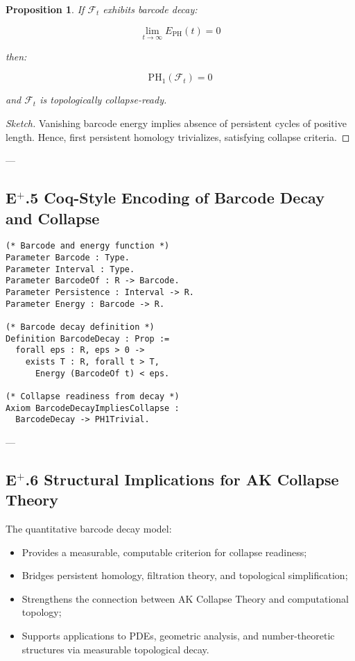 \documentclass[11pt]{article}
\newtheorem{proposition}[theorem]{Proposition}
\begin{document}
\begin{proposition}
If $\mathcal{F}_t$ exhibits barcode decay:

\[
\lim_{t \to \infty} E_{\mathrm{PH}}(t) = 0
\]

then:

\[
\mathrm{PH}_1(\mathcal{F}_t) = 0
\]

and $\mathcal{F}_t$ is topologically collapse-ready.
\end{proposition}

\begin{proof}[Sketch]
Vanishing barcode energy implies absence of persistent cycles of positive length. Hence, first persistent homology trivializes, satisfying collapse criteria.
\end{proof}

---

\subsection*{E$^{+}$.5 Coq-Style Encoding of Barcode Decay and Collapse}

\begin{lstlisting}[language=Coq]
(* Barcode and energy function *)
Parameter Barcode : Type.
Parameter Interval : Type.
Parameter BarcodeOf : R -> Barcode.
Parameter Persistence : Interval -> R.
Parameter Energy : Barcode -> R.

(* Barcode decay definition *)
Definition BarcodeDecay : Prop :=
  forall eps : R, eps > 0 ->
    exists T : R, forall t > T,
      Energy (BarcodeOf t) < eps.

(* Collapse readiness from decay *)
Axiom BarcodeDecayImpliesCollapse :
  BarcodeDecay -> PH1Trivial.
\end{lstlisting}

---

\subsection*{E$^{+}$.6 Structural Implications for AK Collapse Theory}

The quantitative barcode decay model:

\begin{itemize}
    \item Provides a measurable, computable criterion for collapse readiness;
    \item Bridges persistent homology, filtration theory, and topological simplification;
    \item Strengthens the connection between AK Collapse Theory and computational topology;
    \item Supports applications to PDEs, geometric analysis, and number-theoretic structures via measurable topological decay.
\end{itemize}
\end{document}
